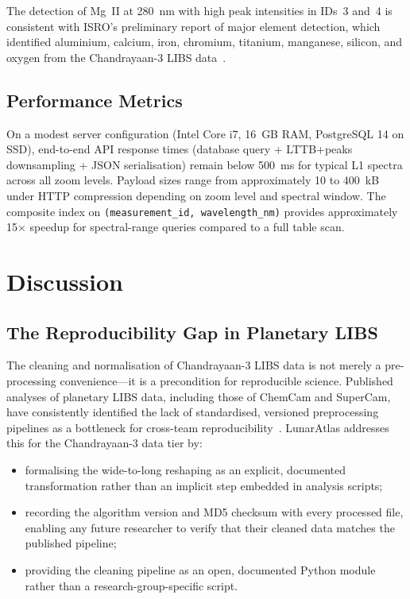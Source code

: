 \documentclass[a4paper,twocolumn,10pt]{article}
\begin{document}
The detection of Mg~II at 280~nm with high peak intensities in IDs~3
and~4 is consistent with ISRO's preliminary report of major element
detection, which identified aluminium, calcium, iron, chromium,
titanium, manganese, silicon, and oxygen from the Chandrayaan-3 LIBS
data~\cite{ISROCh3}.

\subsection{Performance Metrics}

On a modest server configuration (Intel Core i7, 16~GB RAM,
PostgreSQL 14 on SSD), end-to-end API response times (database query
+ LTTB+peaks downsampling + JSON serialisation) remain below
\SI{500}{\milli\second} for typical L1 spectra across all zoom levels.
Payload sizes range from approximately 10 to 400~kB under HTTP
compression depending on zoom level and spectral window.  The
composite index on \texttt{(measurement\_id, wavelength\_nm)}
provides approximately 15$\times$ speedup for spectral-range queries
compared to a full table scan.


\section{Discussion}
\label{sec:discussion}

\subsection{The Reproducibility Gap in Planetary LIBS}

The cleaning and normalisation of Chandrayaan-3 LIBS data is not
merely a pre-processing convenience---it is a precondition for
reproducible science.  Published analyses of planetary LIBS data,
including those of ChemCam and SuperCam, have consistently identified
the lack of standardised, versioned preprocessing pipelines as a
bottleneck for cross-team reproducibility~\cite{Anderson2022,
Clegg2017}.  LunarAtlas addresses this for the Chandrayaan-3 data
tier by:

\begin{itemize}[nosep,leftmargin=*]
  \item formalising the wide-to-long reshaping as an explicit,
    documented transformation rather than an implicit step embedded in
    analysis scripts;
  \item recording the algorithm version and MD5 checksum with every
    processed file, enabling any future researcher to verify that
    their cleaned data matches the published pipeline;
  \item providing the cleaning pipeline as an open, documented Python
    module rather than a research-group-specific script.
\end{itemize}
\end{document}
